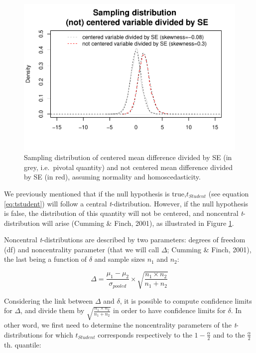 \documentclass[
  man,floatsintext]{apa6}
\begin{document}
\begin{figure}
\centering
\includegraphics{CI_files/figure-latex/SAMPLMEANDIFF3-1.pdf}
\caption{\label{fig:SAMPLMEANDIFF3}Sampling distribution of centered mean difference divided by SE (in grey, i.e.~pivotal quantity) and not centered mean difference divided by SE (in red), assuming normality and homoscedasticity.}
\end{figure}

We previously mentioned that if the null hypothesis is true,\(t_{Student}\) (see equation \eqref{eq:tstudent}) will follow a central \emph{t}-distribution. However, if the null hypothesis is false, the distribution of this quantity will not be centered, and noncentral \emph{t}-distribution will arise (Cumming \& Finch, 2001), as illustrated in Figure \ref{fig:SAMPLMEANDIFF3}.

Noncentral \emph{t}-distributions are described by two parameters: degrees of freedom (df) and noncentrality parameter (that we will call \(\Delta\); Cumming \& Finch, 2001), the last being a function of \(\delta\) and sample sizes \(n_1\) and \(n_2\):

\begin{equation}
\Delta = \frac{\mu_1-\mu_2}{\sigma_{pooled}} \times \sqrt{\frac{n_1 \times n_2}{n_1 + n_2}}
\label{eq:ncp}
\end{equation}

Considering the link between \(\Delta\) and \(\delta\), it is possible to compute confidence limits for \(\Delta\), and divide them by \(\sqrt{\frac{n_1 \times n_2}{n_1 + n_2}}\) in order to have confidence limits for \(\delta\). In other word, we first need to determine the noncentrality parameters of the \emph{t}-distributions for which \(t_{Student}\) corresponds respectively to the \(1-\frac{\alpha}{2}\) and to the \(\frac{\alpha}{2}\) th. quantile:
\end{document}
